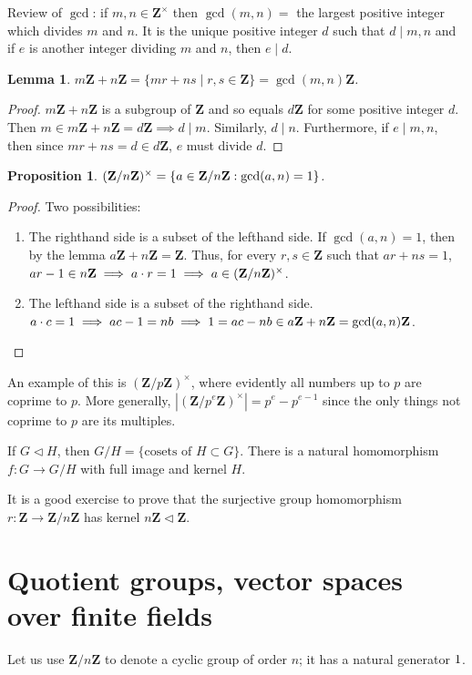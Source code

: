 \documentclass[11pt, oneside]{amsart}
\numberwithin{equation}{section}
\numberwithin{theorem}{section}
\newtheorem{lemma}[theorem]{Lemma}
\newtheorem{proposition}[theorem]{Proposition}
\theoremstyle{definition}
\let\bar\relax
\def\Z{\mathbf{Z}}
\begin{document}
Review of $\gcd$: if $m,n \in \Z^\times$ then $\gcd({m,n}) =$ the largest positive integer which divides $m$ and $n$. It is the unique positive integer $d$ such that $d\mid m, n$ and if $e$ is another integer dividing $m$ and $n$, then $e\mid d$.
\begin{lemma}
$m\Z + n\Z = \{mr+ ns \mid r,s\in\Z\}=\gcd({m,n})\Z$.
\end{lemma}
\begin{proof}
$m\Z + n\Z$ is a subgroup of $\Z$ and so equals $d\Z$ for some positive integer $d$. Then $m\in m\Z+n\Z =d\Z\implies d\mid m$. Similarly, $d\mid n$. Furthermore, if $e\mid m, n$, then since $mr +ns = d\in d\Z$, $e$ must divide $d$.
\end{proof}
\begin{proposition}
$(\Z/n\Z)^\times = \{\bar{a}\in\Z/n\Z : \gcd(a,n)=1\}$.
\end{proposition} 
\begin{proof}
 Two possibilities:\begin{enumerate}[label=(\roman*)]
\item The righthand side is a subset of the lefthand side. If $\gcd(a,n)=1$, then by the lemma $a\Z+n\Z = \Z$. Thus, for every $r,s\in\Z$ such that $ar+ns=1$, $ar-1\in n\Z\implies\bar{a}\cdot\bar{r}=\bar{1}\implies\bar{a}\in(\Z/n\Z)^\times$.
\item The lefthand side is a subset of the righthand side. $\bar{a}\cdot\bar{c} = \bar{1}\implies ac-1=nb \implies 1 = ac-nb \in a \Z+n\Z=\gcd(a,n)\Z$.
\end{enumerate}
\end{proof}

An example of this is $(\Z/p\Z)^\times$, where evidently all numbers up to $p$ are coprime to $p$. More generally, $|(\Z/p^e\Z)^\times|=p^e-p^{e-1}$ since the only things not coprime to $p$ are its multiples.

If $G\lhd H$, then $G/H = \{\textrm{cosets of } H\subset G\}$. There is a natural homomorphism $f : G\to G/H$ with full image and kernel $H$.

It is a good exercise to prove that the surjective group homomorphism ${r} : \Z \to \Z/n\Z$ has kernel $n\Z\lhd \Z$.
\section{Quotient groups, vector spaces over finite fields}
Let us use $\Z/n\Z$ to denote a cyclic group of order $n$; it has a natural generator $\bar{1}$. 
\end{document}
